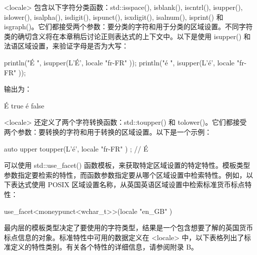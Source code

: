 
<locale> 包含以下字符分类函数：std::isspace(), isblank(), iscntrl(), isupper(), islower(), isalpha(), isdigit(), ispunct(), isxdigit(), isalnum(), isprint() 和 isgraph()。它们都接受两个参数：要分类的字符和用于分类的区域设置。不同字符类的确切含义将在本章稍后讨论正则表达式的上下文中。以下是使用 isupper() 和法语区域设置，来验证字母是否为大写：

\begin{cpp}
println("É {}", isupper(L'É', locale{ "fr-FR" }));
println("é {}", isupper(L'é', locale{ "fr-FR" }));
\end{cpp}

输出为：

\begin{shell}
É true
é false
\end{shell}


<locale> 还定义了两个字符转换函数：std::toupper() 和 tolower()。它们都接受两个参数：要转换的字符和用于转换的区域设置。以下是一个示例：

\begin{cpp}
auto upper { toupper(L'é', locale { "fr-FR" }) }; // É
\end{cpp}


可以使用 std::use\_facet() 函数模板，来获取特定区域设置的特定特性。模板类型参数指定要检索的特性，而函数参数指定要从哪个区域设置中检索特性。例如，以下表达式使用 POSIX 区域设置名称，从英国英语区域设置中检索标准货币标点特性：

\begin{cpp}
use_facet<moneypunct<wchar_t>>(locale { "en_GB" })
\end{cpp}

最内层的模板类型决定了要使用的字符类型，结果是一个包含想要了解的英国货币标点信息的对象。标准特性中可用的数据定义在 <locale> 中，以下表格列出了标准定义的特性类别。有关各个特性的详细信息，请参阅附录 B。

